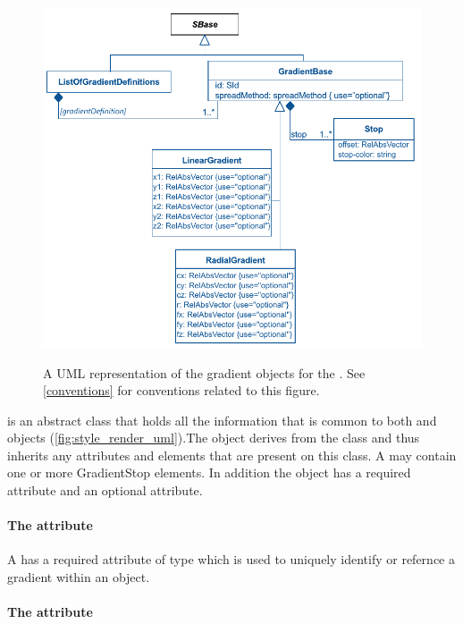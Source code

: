 \begin{figure}[h!]
  \centering
  \includegraphics[width=\textwidth]{images/render-gradient-definitions-uml}\\
  \caption{A UML representation of the gradient objects for the \RenderPackage.  See \ref{conventions} for conventions related to this figure. }
  \label{fig:gradient_render_uml}
\end{figure}


\GradientBase is an abstract class that holds all the information that is common to both \RadialGradient and \LinearGradient objects (\ref{fig:style_render_uml}).The \GradientBase object derives from the \SBase class and thus inherits
any attributes and elements that are present on this class.
A \GradientBase may contain one or more GradientStop elements.
In addition the \GradientBase object has a required  attribute and an optional  attribute.

\paragraph{The \fixttspace{} attribute}

A \GradientBase has a required attribute  of type
 which is used to uniquely identify or refernce a gradient within an \RenderInformation object.

\paragraph{The \fixttspace{} attribute}


